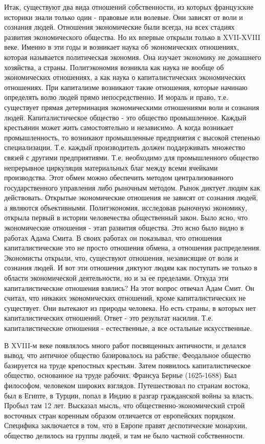 Итак, существуют два вида отношений собственности, из которых французские историки знали только один - правовые или волевые. Они зависят от воли и сознания людей. Отношения экономические были всегда, на всех стадиях развития экономического общества. Но их впервые открыли только в XVII-XVIII веке. Именно в эти годы и возникает наука об экономических отношениях, которая называется политическая экономия. Она изучает экономику не домашнего хозяйства, а страны. Политэкономия возникла как наука не вообще об экономических отношениях, а как наука о капиталистических экономических отношениях. При капитализме возникают такие отношения, которые начинаю определять волю людей прямо непосредственно. И мораль и право, т.е. существует прямая детерминация экономическими отношениями воли и сознания людей. Капиталистическое общество - это общество промышленное. Каждый крестьянин может жить самостоятельно и независимо. А когда возникает промышленность, то возникают промышленные предприятия с высокой степенью специализации. Т.е. каждый производитель должен поддерживать множество связей с другими предприятиями. Т.е. необходимо для промышленного общество непрерывное циркуляция материальных благ между всеми ячейками производства. Этот обмен можно обеспечить методом централизованного государственного управления либо рыночным методом. Рынок диктует людям как действовать. Открытые экономические отношения не зависят от сознания людей, а являются объективными. Политэкономия, исследовав рыночную экономику, открыла первый в истории человечества общественный закон. Было ясно, что экономические отношения - этап развития общества. Это ясно было видно в работах Адама Смита. В своих работах он показывал, что отношения капиталистические это не просто отношения обмена, а отношения распределения. Экономисты открыли, что, существуют отношения, независящие от воли и сознания людей. И вот эти отношения диктуют людям как поступать не только в области экономической деятельности, но и за ее пределами. Откуда эти капиталистические отношения взялись? На этот вопрос отвечал Адам Смит. Он считал, что никаких экономических отношений, кроме капиталистических не существует. Они вытекают из природы человека. Но есть страны, в которых нет капиталистических отношений. Ответ - это результат насилия. Т.е. капиталистические отношения - естественные, а все остальные искусственные.

В XVIII-м веке появлялось много работ посвященных античности, и делался вывод, что античное общество базировалось на рабстве. Феодальное общество базируется на труде крепостных крестьян. Затем появилось капиталистическое общество, основанное на труде рабочих. Франсуа Бернье (1625-1688) Был философом, человеком широких взглядов. Путешествовал по странам востока, был в Египте, в Турции, попал в Индию в разгар гражданской войны за власть. Пробыл там 12 лет. Высказал мысль, что общественно-экономический строй восточных стран коренным образом отличается от европейских порядком. Специфика заключается в том, что в Европе правят деспотические монархии, общество делилось на группы людей, и там не было частной собственности.
